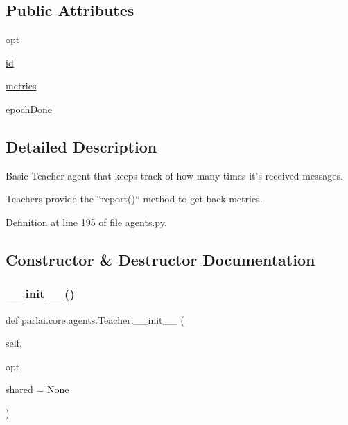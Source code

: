 \subsection*{Public Attributes}
\begin{DoxyCompactItemize}
\item 
\hyperlink{classparlai_1_1core_1_1agents_1_1Teacher_a3ce6243860ce978a897922863ed32fa4}{opt}
\item 
\hyperlink{classparlai_1_1core_1_1agents_1_1Teacher_a8385159acf54471fee8887ba2a83b53c}{id}
\item 
\hyperlink{classparlai_1_1core_1_1agents_1_1Teacher_a159705efe2a9f389d8adfdad76891f08}{metrics}
\item 
\hyperlink{classparlai_1_1core_1_1agents_1_1Teacher_a2a21915f2270b76ba0e99137d506af89}{epoch\+Done}
\end{DoxyCompactItemize}


\subsection{Detailed Description}
\begin{DoxyVerb}Basic Teacher agent that keeps track of how many times it's received messages.

Teachers provide the ``report()`` method to get back metrics.
\end{DoxyVerb}
 

Definition at line 195 of file agents.\+py.



\subsection{Constructor \& Destructor Documentation}
\mbox{\label{classparlai_1_1core_1_1agents_1_1Teacher_ab15a6b5c801681b96bcb9725df0c7c7d}} 
\subsubsection{\texorpdfstring{\+\_\+\+\_\+init\+\_\+\+\_\+()}{\_\_init\_\_()}}
{\footnotesize\ttfamily def parlai.\+core.\+agents.\+Teacher.\+\_\+\+\_\+init\+\_\+\+\_\+ (\begin{DoxyParamCaption}\item[{}]{self,  }\item[{}]{opt,  }\item[{}]{shared = {\ttfamily None} }\end{DoxyParamCaption})}



